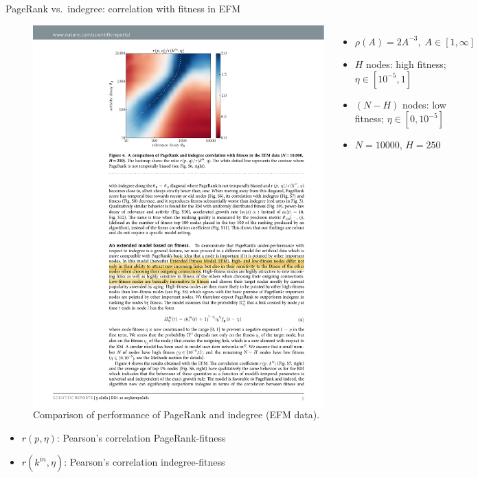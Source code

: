 \begin{frame}{PageRank vs.\ indegree: correlation with fitness in EFM}
    \begin{figure}
        \begin{columns}

            \includegraphics[width=1.0\textwidth]{figures/PageRankEFM_heatmap}

            \caption{Comparison of performance of PageRank and indegree (EFM data).}

            \begin{footnotesize}
            \begin{itemize}
                \item $\rho(A) = 2A^{-3}, \; A \in [1, \infty]$
                \item $H$ nodes: high fitness; $\eta \in [10^{-5}, 1]$
                \item $(N-H)$ nodes: low fitness; $\eta \in [0, 10^{-5}]$
                \item $N=10000$, $H=250$
            \end{itemize}
            \end{footnotesize}
        \end{columns}
    \end{figure}
    \begin{itemize}
        \item $r(p, \eta)$: Pearson's correlation PageRank-fitness
        \item $r(k^{in}, \eta)$: Pearson's correlation indegree-fitness
    \end{itemize}
\end{frame}

